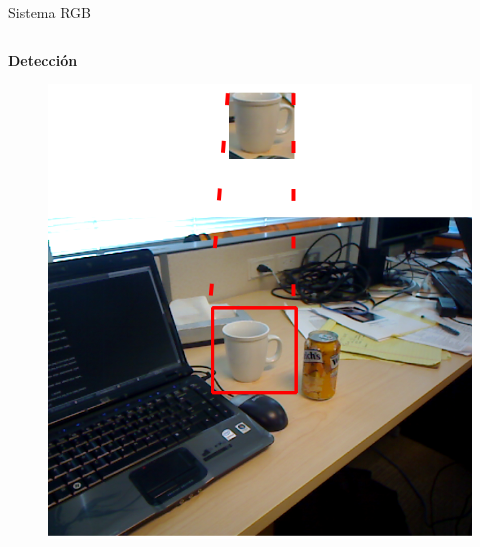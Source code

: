 \documentclass[]{beamer}
\begin{document}
\begin{frame}{Sistema RGB}
\begin{columns}
        \begin{column}{5cm}
            \begin{center}
                \textbf{Detección}
            \end{center}

            \begin{figure}[t]
                \centering
                \vspace{-10pt}
                \includegraphics[width=\textwidth]{img/template_matching/template_matching_marcado.png}
            \end{figure}
        \end{column}
    \end{columns}



\end{frame}
\end{document}
